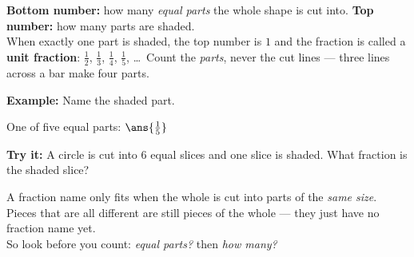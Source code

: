\documentclass[12pt]{article}
\begin{document}


\begin{formulabox}
\textbf{Bottom number:} how many \emph{equal parts} the whole shape is cut
into. \quad \textbf{Top number:} how many parts are shaded.\\[3pt]
When exactly one part is shaded, the top number is $1$ and the fraction is
called a \textbf{unit fraction}: $\frac{1}{2}$, $\frac{1}{3}$, $\frac{1}{4}$,
$\frac{1}{5}$, \ldots\ Count the \emph{parts}, never the cut lines --- three
lines across a bar make four parts.
\end{formulabox}

\begin{examplebox}
\textbf{Example:} \quad Name the shaded part.
\begin{center}
\end{center}

One of five equal parts: $\ans{\tfrac{1}{5}}$
\end{examplebox}

\begin{tryitbox}
\textbf{Try it:} \quad A circle is cut into $6$ equal slices and one slice is
shaded. What fraction is the shaded slice?\\[2pt]
\end{tryitbox}


\begin{formulabox}
A fraction name only fits when the whole is cut into parts of the \emph{same
size}. Pieces that are all different are still pieces of the whole --- they
just have no fraction name yet.\\[3pt]
So look before you count: \emph{equal parts?} then \emph{how many?}
\end{formulabox}
\end{document}
